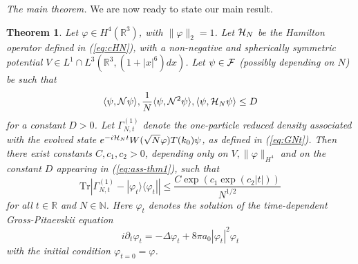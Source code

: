 \documentclass[11pt,a4paper]{article}
\newtheorem{thm}{Theorem}[section]  %
\newcommand{\bR}{{\mathbb R}}
\newcommand{\bN}{{\mathbb N}}
\newcommand{\tr}{\mbox{Tr}}
\newcommand{\cF}{{\cal F}}
\newcommand{\cH}{{\cal H}}
\newcommand{\cN}{{\cal N}}
\begin{document}
\bigskip

{\it The main theorem.} We are now ready to state our main result. 
\begin{thm}\label{thm:main}
Let $\varphi \in H^4 (\bR^3)$, with $\| \varphi \|_2 =1$. Let $\cH_N$ be the
Hamilton operator defined in (\ref{eq:cHN}), with a non-negative and
spherically symmetric potential $V \in L^1\cap L^3 (\bR^3, (1+|x|^6) dx)$. Let $\psi \in \cF$ (possibly depending on $N$) be such that
\begin{equation}\label{eq:ass-thm1} \langle \psi , \cN \psi \rangle ,  \frac{1}{N} \langle \psi , \cN^2 \psi \rangle, \langle \psi, \cH_N \psi \rangle \leq D \end{equation}
for a constant $D>0$. Let $\Gamma_{N,t}^{(1)}$ denote the one-particle reduced density associated with the evolved state $e^{-i\cH_N t} W(\sqrt{N} \varphi) T(k_0) \psi$, as defined in (\ref{eq:GNt}). Then there exist constants $C, c_1, c_2 >0$, depending only on $V, \| \varphi \|_{H^4}$ and on the constant $D$ appearing in (\ref{eq:ass-thm1}), such that
\begin{equation}\label{eq:mt} \tr \left| \Gamma_{N,t}^{(1)} - |\varphi_t\rangle \langle \varphi_t| \right| \leq \frac{C \exp (c_1 \exp (c_2 |t|))}{N^{1/2}} \end{equation}
for all $t \in \bR$ and $N \in \bN$. Here $\varphi_t$ denotes the solution of the time-dependent Gross-Pitaevskii equation
\begin{equation}\label{eq:GP} i\partial_t \varphi_t = -\Delta \varphi_t + 8 \pi a_0 |\varphi_t|^2 \varphi_t \end{equation}
with the initial condition $\varphi_{t=0} =\varphi$.
\end{thm}
\end{document}
